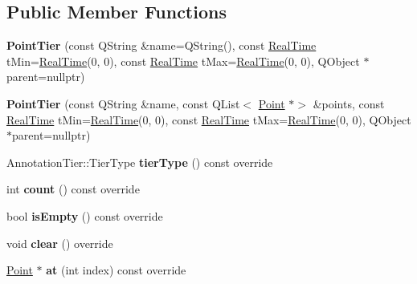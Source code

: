 \subsection*{Public Member Functions}
\begin{DoxyCompactItemize}
\item 
\mbox{\label{class_point_tier_a2a5fcd9bb2cc7cf21215a70802a720bc}} 
{\bfseries Point\+Tier} (const Q\+String \&name=Q\+String(), const \hyperlink{struct_real_time}{Real\+Time} t\+Min=\hyperlink{struct_real_time}{Real\+Time}(0, 0), const \hyperlink{struct_real_time}{Real\+Time} t\+Max=\hyperlink{struct_real_time}{Real\+Time}(0, 0), Q\+Object $\ast$parent=nullptr)
\item 
\mbox{\label{class_point_tier_a5be98fe18e1751c7fabd086cd659e1a2}} 
{\bfseries Point\+Tier} (const Q\+String \&name, const Q\+List$<$ \hyperlink{class_point}{Point} $\ast$$>$ \&points, const \hyperlink{struct_real_time}{Real\+Time} t\+Min=\hyperlink{struct_real_time}{Real\+Time}(0, 0), const \hyperlink{struct_real_time}{Real\+Time} t\+Max=\hyperlink{struct_real_time}{Real\+Time}(0, 0), Q\+Object $\ast$parent=nullptr)
\item 
\mbox{\label{class_point_tier_aa46f07c3a6b7a6851159b8290cb81a51}} 
Annotation\+Tier\+::\+Tier\+Type {\bfseries tier\+Type} () const override
\item 
\mbox{\label{class_point_tier_ae8d72c0f6966e7de09194dc538da8ef0}} 
int {\bfseries count} () const override
\item 
\mbox{\label{class_point_tier_aaabbbf13d3385239102b542254dca6d1}} 
bool {\bfseries is\+Empty} () const override
\item 
\mbox{\label{class_point_tier_afd9bd02536f35383ea29535a0bd46320}} 
void {\bfseries clear} () override
\item 
\mbox{\label{class_point_tier_aeca1fe0759e5c71015d07dfc73f772e0}} 
\hyperlink{class_point}{Point} $\ast$ {\bfseries at} (int index) const override
\item 
\mbox{\label{class_point_tier_a9ee1a1a7484c3b703003a3ac803b9f31}} 
$$
\end{DoxyCompactItemize}
